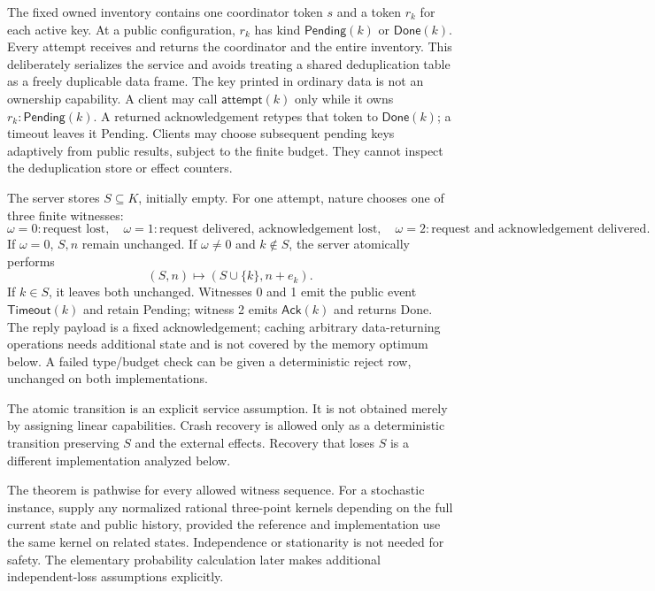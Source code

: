 \documentclass[11pt]{article}
\begin{document}
The fixed owned inventory contains one coordinator token $s$ and a token $r_k$ for each active key. At a public configuration, $r_k$ has kind $\mathsf{Pending}(k)$ or $\mathsf{Done}(k)$. Every attempt receives and returns the coordinator and the entire inventory. This deliberately serializes the service and avoids treating a shared deduplication table as a freely duplicable data frame. The key printed in ordinary data is not an ownership capability. A client may call $\mathsf{attempt}(k)$ only while it owns $r_k:\mathsf{Pending}(k)$. A returned acknowledgement retypes that token to $\mathsf{Done}(k)$; a timeout leaves it Pending. Clients may choose subsequent pending keys adaptively from public results, subject to the finite budget. They cannot inspect the deduplication store or effect counters.

The server stores $S\subseteq K$, initially empty. For one attempt, nature chooses one of three finite witnesses:
\[
\omega=0:\text{request lost},\quad
\omega=1:\text{request delivered, acknowledgement lost},\quad
\omega=2:\text{request and acknowledgement delivered}.
\]
If $\omega=0$, $S,n$ remain unchanged. If $\omega\ne0$ and $k\notin S$, the server atomically performs
\[
(S,n)\longmapsto(S\cup\{k\},n+e_k).
\]
If $k\in S$, it leaves both unchanged. Witnesses 0 and 1 emit the public event $\mathsf{Timeout}(k)$ and retain Pending; witness 2 emits $\mathsf{Ack}(k)$ and returns Done. The reply payload is a fixed acknowledgement; caching arbitrary data-returning operations needs additional state and is not covered by the memory optimum below. A failed type/budget check can be given a deterministic reject row, unchanged on both implementations.

The atomic transition is an explicit service assumption. It is not obtained merely by assigning linear capabilities. Crash recovery is allowed only as a deterministic transition preserving $S$ and the external effects. Recovery that loses $S$ is a different implementation analyzed below.

The theorem is pathwise for every allowed witness sequence. For a stochastic instance, supply any normalized rational three-point kernels depending on the full current state and public history, provided the reference and implementation use the same kernel on related states. Independence or stationarity is not needed for safety. The elementary probability calculation later makes additional independent-loss assumptions explicitly.
\end{document}
